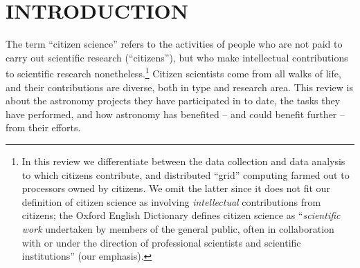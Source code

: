 \documentclass{ar2e}
\begin{document}
\maketitle


\section{INTRODUCTION}
\label{sec:intro}

The term ``citizen science'' refers to the activities of people who are not paid
to carry out scientific research (``citizens''), but who make intellectual
contributions to scientific research nonetheless.\footnote{%
In this review we differentiate between the data collection and data analysis to
which citizens contribute, and distributed ``grid'' computing farmed out to
processors owned by citizens. We omit the latter since it does not fit our
definition of citizen science as involving \textit{intellectual} contributions
from citizens; the Oxford English Dictionary defines citizen science as 
``\textit{scientific work} undertaken by members of the general public, often in
collaboration with or under the direction of professional scientists and
scientific institutions'' (our emphasis).} Citizen scientists come from all walks
of life, and their contributions are diverse, both in type and research area.
This review is about the astronomy projects they have participated in to date,
the tasks they have performed, and how astronomy has benefited -- and could
benefit further -- from their efforts.
\end{document}
